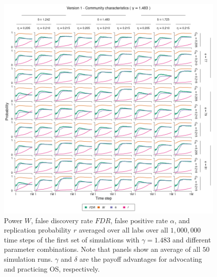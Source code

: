 \documentclass[meta, authordate,issue]{jote-new-article}
\begin{document}
\begin{figure}
  \begin{fullwidth}
    \centering
    \includegraphics[width=\textwidth]{v1_cha_plot_sens_payypro1.483.png}
    \caption{Power $W$, false discovery rate $FDR$, false positive rate $\alpha$, and replication probability $r$ averaged over all labs over all $1,000,000$ time steps of the first set of simulations with $\gamma=1.483$ and different parameter combinations. Note that panels show an average of all $50$ simulation runs. $\gamma$ and $\delta$ are the payoff advantages for advocating and practicing OS, respectively.}
    \label{fig:v1_cha_plot_sens_payypro1.483}
  \end{fullwidth}
\end{figure}
%
%
\end{document}
